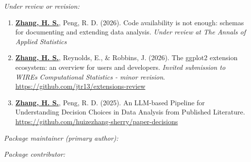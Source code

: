 \documentclass[10pt,a4paper]{article} %
\begin{document}
\noindent\textit{Under review or revision:}\vspace{-0.5em}
\begin{enumerate}[resume]

    \item \underline{\textbf{Zhang, H. S.}}, Peng, R. D. (2026). Code availability is 
    not enough: schemas for documenting and extending data analysis. \emph{Under review at The Annals of Applied Statistics}

    \item \underline{\textbf{Zhang, H. S.}}, Reynolds, E., \& Robbins, J. (2026).
    The ggplot2 extension ecosystem: an overview for users and developers.
    \emph{Invited submission to WIREs Computational Statistics - minor revision}. \url{https://github.com/jtr13/extensions-review}

    \item \underline{\textbf{Zhang, H. S.}}, Peng, R. D. (2025). An LLM-based Pipeline for
    Understanding Decision Choices in Data Analysis from Published Literature. 
    \url{https://github.com/huizezhang-sherry/paper-decisions}

\end{enumerate}


\noindent\textit{Package maintainer (primary author):}

\vspace{0.5em}

 \newline
{} \newline 
{} \newline 
{} \newline 

\vspace{1em}
\noindent\textit{Package contributor:}

\vspace{0.5em}
 \newline
{} \newline
{}
\end{document}
